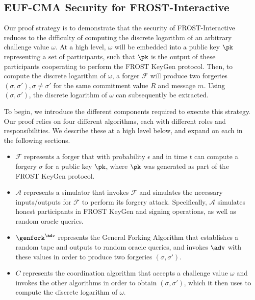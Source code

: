 \subsection{EUF-CMA Security for FROST-Interactive}
\label{security-proofs}


Our proof strategy is to demonstrate that the security of
FROST-Interactive
reduces to the difficulty of computing the discrete logarithm of
an arbitrary challenge value $\omega$. At a high level, $\omega$ will be
embedded into a public key $\pk$ representing a set of participants, such that
$\pk$ is the output of these participants cooperating to perform the FROST KeyGen
protocol. Then, to compute the discrete logarithm of  $\omega$, a forger
$\mathcal{F}$ will produce two forgeries $(\sigma, \sigma'), \sigma \neq
\sigma'$ for the same commitment value $R$ and message $m$. Using $(\sigma,
\sigma')$, the discrete logarithm of $\omega$ can subsequently be extracted.


To begin, we introduce the different components required to execute this strategy. Our
proof relies on four different algorithms, each with different roles and
responsibilities. We describe these at a high level below, and expand on each
in the following sections.

\begin{itemize}
\item[-] $\mathcal{F}$ represents a forger that with probability $\epsilon$ and
  in time $t$ can compute a forgery $\sigma$ for a public key $\pk$, where $\pk$
    was generated as part of the FROST KeyGen protocol.
\item[-] $\mathcal{A}$ represents a simulator that invokes $\mathcal{F}$ and
  simulates the necessary inputs/outputs for $\mathcal{F}$ to perform its
    forgery attack. Specifically, $\mathcal{A}$ simulates honest participants
    in FROST KeyGen and signing operations, as well as random
    oracle queries.
\item[-] $\genfork^\adv$ represents the General Forking Algorithm that establishes a
  random tape and outputs to random oracle queries, and invokes $\adv$
    with these values in order to produce two forgeries $(\sigma, \sigma')$.
\item[-] $C$ represents the coordination algorithm that accepts a challenge
  value $\omega$ and invokes the other algorithms in order to obtain $(\sigma,
    \sigma')$, which it then uses to compute the discrete logarithm of
    $\omega$.
\end{itemize}

